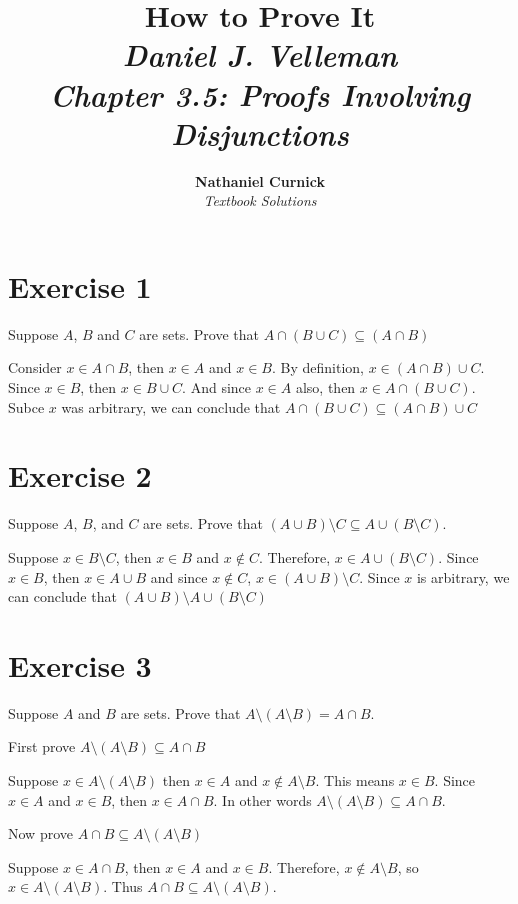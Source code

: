 \documentclass[11pt]{article}
\title{\textbf{How to Prove It} \\ {\Large\itshape Daniel J. Velleman} \\ {\Large\itshape Chapter 3.5: Proofs Involving Disjunctions}}
\author{\textbf{Nathaniel Curnick} \\ \textit{Textbook Solutions}}
\date{}
\begin{document}
\maketitle

\section*{Exercise 1}

Suppose $A$, $B$ and $C$ are sets. Prove that $A \cap (B \cup C) \subseteq (A \cap B)$

Consider $x \in A \cap B$, then $x \in A$ and $x \in B$. By definition, 
$x \in (A \cap B) \cup C$. Since $x \in B$, then $x \in B \cup C$. And since 
$x \in A$ also, then $x \in A \cap (B \cup C)$. Subce $x$ was arbitrary, we can 
conclude that $A \cap (B \cup C) \subseteq (A \cap B) \cup C$

\section*{Exercise 2}

Suppose $A$, $B$, and $C$ are sets. Prove that 
$(A \cup B) \setminus C \subseteq A \cup (B \setminus C)$.

Suppose $x \in B \setminus C$, then $x \in B$ and $x \notin C$. Therefore, 
$x \in A \cup (B \setminus C)$. Since $x \in B$, then $x \in A \cup B$ and 
since $x \notin C$, $x \in (A \cup B) \setminus C$. Since $x$ is arbitrary, we
can conclude that $(A \cup B) \setminus A \cup (B \setminus C)$

\section*{Exercise 3}

Suppose $A$ and $B$ are sets. Prove that $A \setminus (A \setminus B) = A \cap B$.

First prove $A \setminus (A \setminus B) \subseteq A \cap B$

Suppose $x \in A \setminus (A \setminus B)$ then $x \in A$ and 
$x \notin A \setminus B$. This means $x \in B$. Since $x \in A$ and $x \in B$, 
then $x \in A \cap B$. In other words $A \setminus (A \setminus B) \subseteq A \cap B$.

Now prove $A \cap B \subseteq A \setminus (A \setminus B)$

Suppose $x \in A \cap B$, then $x \in A$ and $x \in B$. Therefore, 
$x \notin A \setminus B$, so $x \in A \setminus (A \setminus B)$. Thus 
$A \cap B \subseteq A \setminus (A \setminus B)$.
\end{document}
